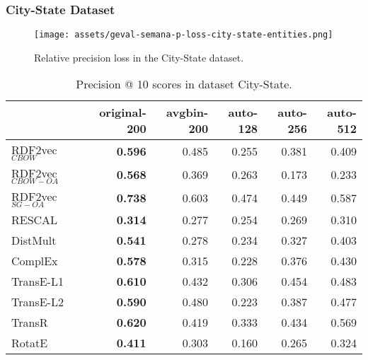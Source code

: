 \documentclass[11pt,titlepage,oneside,openany]{book}
\begin{document}
\newpage

\subsubsection{City-State Dataset}
\label{subsubsec:geval-results-semana-city-state-entities}


\begin{figure}[H]
    \centering
    \texttt{[image: assets/geval-semana-p-loss-city-state-entities.png]}
    \vspace*{-3mm}
    \caption{Relative precision loss in the City-State dataset.}
    \label{fig:geval-semana-p-loss-city-state-entities}
\end{figure}


\begin{table}[H]
\centering
\begin{tabular}{lrrrrr}
\toprule
{} &  original-200 &  avgbin-200 &  auto-128 &  auto-256 &  auto-512 \\
\midrule
RDF2vec$_{CBOW}$     &	\textbf{0.596} &       0.485  &     0.255  &     0.381  &     0.409  \\
RDF2vec$_{CBOW-OA}$  &	\textbf{0.568} &       0.369  &     0.263  &     0.173  &     0.233  \\
RDF2vec$_{SG-OA}$    &	\textbf{0.738} &       0.603  &     0.474  &     0.449  &     0.587  \\
RESCAL               &	\textbf{0.314} &       0.277  &     0.254  &     0.269  &     0.310  \\
DistMult             &	\textbf{0.541} &       0.278  &     0.234  &     0.327  &     0.403  \\
ComplEx              &	\textbf{0.578} &       0.315  &     0.228  &     0.376  &     0.430  \\
TransE-L1            &	\textbf{0.610} &       0.432  &     0.306  &     0.454  &     0.483  \\
TransE-L2            &	\textbf{0.590} &       0.480  &     0.223  &     0.387  &     0.477  \\
TransR               &	\textbf{0.620} &       0.419  &     0.333  &     0.434  &     0.569  \\
RotatE               &	\textbf{0.411} &       0.303  &     0.160  &     0.265  &     0.324  \\
\bottomrule
\end{tabular}
\caption{Precision @ 10 scores in dataset City-State.}
\label{tab:geval-semana-p-at-10-city-state-entities}
\end{table}
\end{document}
